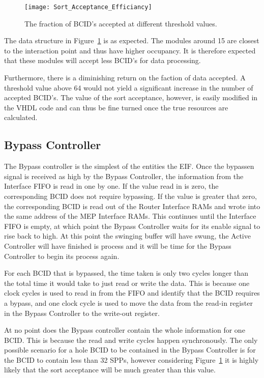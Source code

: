			\begin{figure}[ht]
				\centering
				\texttt{[image: Sort\_Acceptance\_Efficiancy]}
				\caption{The fraction of BCID's accepted at different threshold values.}
				\label{fig:sort_acceptance}
			\end{figure}

			The data structure in Figure~\ref{fig:sort_acceptance} is as expected.
			The modules around 15 are closest to the interaction point and thus have higher occupancy.
			It is therefore expected that these modules will accept less BCID's for data processing.

			Furthermore, there is a diminishing return on the faction of data accepted.
			A threshold value above 64 would not yield a significant increase in the number of accepted BCID's.
			The value of the sort acceptance, however, is easily modified in the VHDL code and can thus be fine turned once the true resources are calculated.

	\subsection{Bypass Controller} %
	\label{sub:bypass}
		
		The Bypass controller is the simplest of the entities the EIF.
		Once the bypass\textunderscore en signal is received as high by the Bypass Controller, the information from the Interface FIFO is read in one by one.
		If the value read in is zero, the corresponding BCID does not require bypassing.
		If the value is greater that zero, the corresponding BCID is read out of the Router Interface RAMs and wrote into the same address of the MEP Interface RAMs.
		This continues until the Interface FIFO is empty, at which point the Bypass Controller waits for its enable signal to rise back to high.
		At this point the swinging buffer will have swung, the Active Controller will have finished is process and it will be time for the Bypass Controller to begin its process again.

		For each BCID that is bypassed, the time taken is only two cycles longer than the total time it would take to just read or write the data.
		This is because one clock cycles is used to read in from the FIFO and identify that the BCID requires a bypass, and one clock cycle is used to move the data from the read-in register in the Bypass Controller to the write-out register.

		At no point does the Bypass controller contain the whole information for one BCID.
		This is because the read and write cycles happen synchronously.
		The only possible scenario for a hole BCID to be contained in the Bypass Controller is for the BCID to contain less than 32 SPPs, however considering Figure~\ref{fig:sort_acceptance} it is highly likely that the sort acceptance will be much greater than this value.

